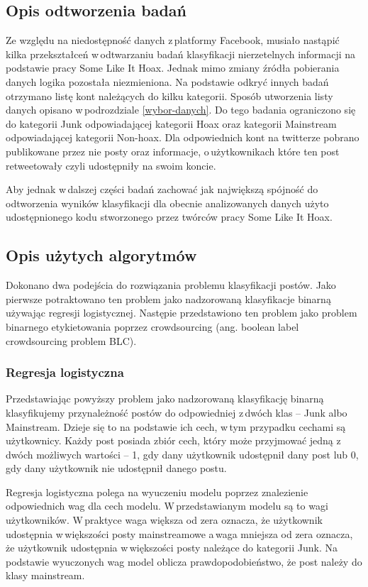\subsection{Opis odtworzenia badań }
Ze względu na niedostępność danych z\,platformy Facebook, musiało nastąpić kilka przekształceń w\,odtwarzaniu badań klasyfikacji nierzetelnych informacji na podstawie pracy Some Like It Hoax. Jednak mimo zmiany źródła pobierania danych logika pozostała niezmieniona. Na podstawie odkryć innych badań otrzymano listę kont należących do kilku kategorii. Sposób utworzenia listy danych opisano w\,podrozdziale \ref{wybor-danych}. Do tego badania ograniczono się do kategorii Junk odpowiadającej kategorii Hoax oraz kategorii Mainstream odpowiadającej kategorii Non-hoax. Dla odpowiednich kont na twitterze pobrano publikowane przez nie posty oraz informacje, o\,użytkownikach które ten post retweetowały czyli udostępniły na swoim koncie. 
\par
Aby jednak w\,dalszej części badań zachować jak największą spójność do odtworzenia wyników klasyfikacji dla obecnie analizowanych danych użyto udostępnionego kodu stworzonego przez twórców pracy Some Like It Hoax. 

\subsection{Opis użytych algorytmów }
Dokonano dwa podejścia do rozwiązania problemu klasyfikacji postów. Jako pierwsze potraktowano ten problem jako nadzorowaną klasyfikacje binarną używając regresji logistycznej. Następie przedstawiono ten problem jako problem binarnego etykietowania poprzez crowdsourcing (ang. boolean label crowdsourcing problem BLC). 
\subsubsection{Regresja logistyczna}
Przedstawiając powyższy problem jako nadzorowaną klasyfikację binarną klasyfikujemy przynależność postów do odpowiedniej z\,dwóch klas – Junk albo Mainstream. Dzieje się to na podstawie ich cech, w\,tym przypadku cechami są użytkownicy. Każdy post posiada zbiór cech, który może przyjmować jedną z\,dwóch możliwych wartości – 1, gdy dany użytkownik udostępnił dany post lub 0, gdy dany użytkownik nie udostępnił danego postu.
\par
Regresja logistyczna polega na wyuczeniu modelu poprzez znalezienie odpowiednich wag dla cech modelu.  W\,przedstawianym modelu są to wagi użytkowników. W\,praktyce waga większa od zera oznacza, że użytkownik udostępnia w\,większości posty mainstreamowe a\,waga mniejsza od zera oznacza, że użytkownik udostępnia w\,większości posty należące do kategorii Junk. Na podstawie wyuczonych wag model oblicza prawdopodobieństwo, że post należy do klasy mainstream.

